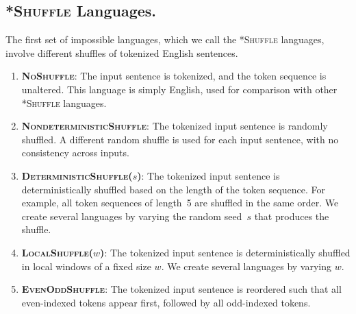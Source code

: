 \documentclass[11pt]{article}
\begin{document}
\subsection{\textsc{*Shuffle} Languages.}

The first set of impossible languages, which we call the \textsc{*Shuffle} languages, involve different shuffles of tokenized English sentences. 

\begin{enumerate}
    \item \textbf{\textcolor{controlshuf}{\textsc{NoShuffle}}}: The input sentence is tokenized, and the token sequence is unaltered. This language is simply English, used for comparison with other \textsc{*Shuffle} languages.
    
    \item \textbf{\textcolor{nondetshuf}{\textsc{NondeterministicShuffle}}}: The tokenized input sentence is randomly shuffled. A different random shuffle is used for each input sentence, with no consistency across inputs.

    \item \textbf{\textcolor{detshuf57}{\textsc{DeterministicShuffle}($s$)}}: The tokenized input sentence is deterministically shuffled based on the length of the token sequence. For example, all token sequences of length~5 are shuffled in the same order. We create several languages by varying the random seed~$s$ that produces the shuffle.

    \item \textbf{\textcolor{locshuf5}{\textsc{LocalShuffle}($w$)}}: The tokenized input sentence is deterministically shuffled in local windows of a fixed size $w$. We create several languages by varying $w$.

    \item \textbf{\textcolor{evenodd}{\textsc{EvenOddShuffle}}}: The tokenized input sentence is reordered such that all even-indexed tokens appear first, followed by all odd-indexed tokens.
    
\end{enumerate}
\end{document}
